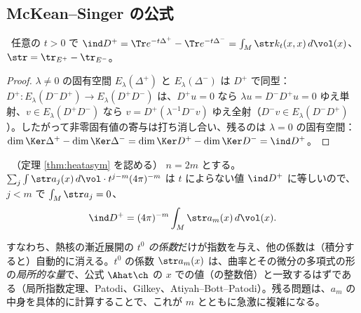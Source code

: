 \subsection{McKean--Singer の公式}
\begin{prop}\label{prop:MS}\tP\
任意の $t>0$ で $\ind D^+=\Tr e^{-t\Delta^+}-\Tr e^{-t\Delta^-}=\int_M\str k_t(x,x)\,d\vol(x)$、$\str=\tr_{E^+}-\tr_{E^-}$。
\end{prop}
\begin{proof}
$\lambda\ne0$ の固有空間 $E_\lambda(\Delta^+)$ と $E_\lambda(\Delta^-)$ は $D^+$ で同型：$D^+:E_\lambda(D^-D^+)\to E_\lambda(D^+D^-)$ は、$D^+u=0$ なら $\lambda u=D^-D^+u=0$ ゆえ単射、$v\in E_\lambda(D^+D^-)$ なら $v=D^+(\lambda^{-1}D^-v)$ ゆえ全射（$D^-v\in E_\lambda(D^-D^+)$）。したがって非零固有値の寄与は打ち消し合い、残るのは $\lambda=0$ の固有空間：$\dim\Ker\Delta^+-\dim\Ker\Delta^-=\dim\Ker D^+-\dim\Ker D^-=\ind D^+$。
\end{proof}
\begin{cor}[局所指数定理の骨格]\label{cor:localindex}\tP\ （定理 \ref{thm:heatasym} を認める）
$n=2m$ とする。$\sum_j\int\str a_j(x)\,d\vol\cdot t^{j-m}(4\pi)^{-m}$ は $t$ によらない値 $\ind D^+$ に等しいので、$j<m$ で $\int_M\str a_j=0$、
\[
\ind D^+=(4\pi)^{-m}\int_M\str a_m(x)\,d\vol(x).
\]
\end{cor}
\noindent すなわち、熱核の漸近展開の \emph{$t^0$ の係数}だけが指数を与え、他の係数は（積分すると）自動的に消える。$t^0$ の係数 $\str a_m(x)$ は、曲率とその微分の多項式の形の\emph{局所的な量}で、公式 $\Ahat\ch$ の $x$ での値（の整数倍）と一致するはずである（局所指数定理、Patodi、Gilkey、Atiyah--Bott--Patodi）。残る問題は、$a_m$ の中身を具体的に計算することで、これが $m$ とともに急激に複雑になる。

